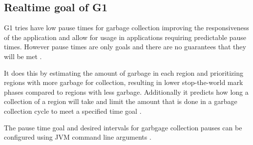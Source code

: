 
\subsection{Realtime goal of G1}

G1 tries have low pause times for garbage collection improving the
responsiveness of the application and allow for usage in applications
requiring predictable pause times. However pause times are only goals
and there are no guarantees that they will be met
\cite[3.2 Satisfying a Soft Real-Time Goal]{java_g1_2004}.

It does this by estimating the amount of garbage in each region and
prioritizing regions with more garbage for collection, resulting in lower stop-the-world mark phases
compared to regions with less garbage. %
Additionally it predicts how long a collection of a region will take and
limit the amount that is done in a garbage collection cycle to meet a
specified time goal \cite[3.2.1 Predicting Evacuation Pause Times]{java_g1_2004}.

The pause time goal and desired intervals for garbgage collection pauses can be configured using
JVM command line arguments \cite[Ergonomic Defaults for G1 GC]{java_g1_getting_started}.

